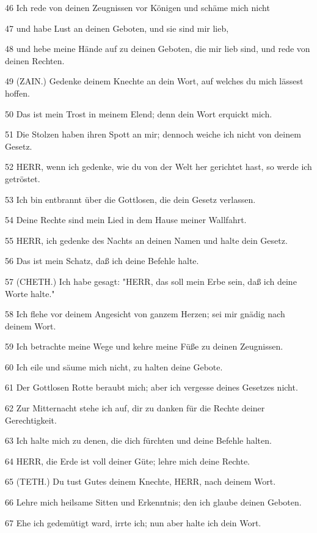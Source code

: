 \par 46 Ich rede von deinen Zeugnissen vor Königen und schäme mich nicht
\par 47 und habe Lust an deinen Geboten, und sie sind mir lieb,
\par 48 und hebe meine Hände auf zu deinen Geboten, die mir lieb sind, und rede von deinen Rechten.
\par 49 (ZAIN.) Gedenke deinem Knechte an dein Wort, auf welches du mich lässest hoffen.
\par 50 Das ist mein Trost in meinem Elend; denn dein Wort erquickt mich.
\par 51 Die Stolzen haben ihren Spott an mir; dennoch weiche ich nicht von deinem Gesetz.
\par 52 HERR, wenn ich gedenke, wie du von der Welt her gerichtet hast, so werde ich getröstet.
\par 53 Ich bin entbrannt über die Gottlosen, die dein Gesetz verlassen.
\par 54 Deine Rechte sind mein Lied in dem Hause meiner Wallfahrt.
\par 55 HERR, ich gedenke des Nachts an deinen Namen und halte dein Gesetz.
\par 56 Das ist mein Schatz, daß ich deine Befehle halte.
\par 57 (CHETH.) Ich habe gesagt: "HERR, das soll mein Erbe sein, daß ich deine Worte halte."
\par 58 Ich flehe vor deinem Angesicht von ganzem Herzen; sei mir gnädig nach deinem Wort.
\par 59 Ich betrachte meine Wege und kehre meine Füße zu deinen Zeugnissen.
\par 60 Ich eile und säume mich nicht, zu halten deine Gebote.
\par 61 Der Gottlosen Rotte beraubt mich; aber ich vergesse deines Gesetzes nicht.
\par 62 Zur Mitternacht stehe ich auf, dir zu danken für die Rechte deiner Gerechtigkeit.
\par 63 Ich halte mich zu denen, die dich fürchten und deine Befehle halten.
\par 64 HERR, die Erde ist voll deiner Güte; lehre mich deine Rechte.
\par 65 (TETH.) Du tust Gutes deinem Knechte, HERR, nach deinem Wort.
\par 66 Lehre mich heilsame Sitten und Erkenntnis; den ich glaube deinen Geboten.
\par 67 Ehe ich gedemütigt ward, irrte ich; nun aber halte ich dein Wort.
